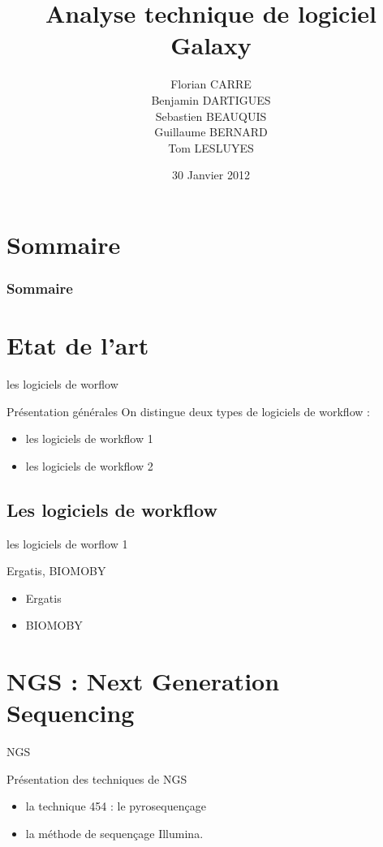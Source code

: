 \documentclass[12pt]{beamer}
\title[Galaxy]{Analyse technique de logiciel\\ Galaxy}
\author[\insertframenumber / 33]{Florian CARRE\\Benjamin DARTIGUES\\Sebastien BEAUQUIS\\Guillaume BERNARD\\Tom LESLUYES}
\date{30 Janvier 2012}
\institute[]{Université de Bordeaux 1}
\begin{document}
\maketitle

\section*{Sommaire}
\begin{frame}
\frametitle{Sommaire}
\tableofcontents[pausesections]
\end{frame}

\section{Etat de l'art}
\begin{frame}{les logiciels de worflow}
\begin{block}{Présentation générales}
On distingue deux types de logiciels de workflow : 
\begin{itemize}
 \item les logiciels de workflow 1
\item les logiciels de workflow 2
\end{itemize}
\end{block}
\end{frame}


\subsection{Les logiciels de workflow }
\begin{frame}{les logiciels de worflow 1}
\begin{block}{Ergatis, BIOMOBY}
\begin{itemize}
 \item Ergatis
\item BIOMOBY
\end{itemize}
\end{block}
\end{frame}



\section{NGS : Next Generation Sequencing}
\begin{frame}{NGS}
\begin{block}{Présentation des techniques de NGS}
\begin{itemize}
 \item la technique 454 : le pyrosequençage
\item la méthode de sequençage Illumina.
\end{itemize}
\end{block}
\end{frame}
\end{document}
